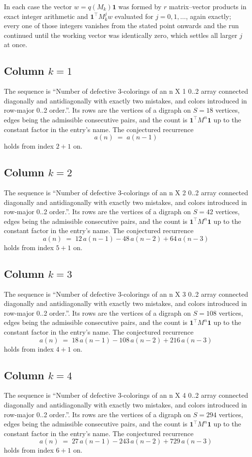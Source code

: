 \documentclass[11pt,a4paper]{article}
\theoremstyle{plain}
\theoremstyle{definition}
\begin{document}
In each case the vector $w=q(M_k)\mathbf{1}$ was formed by $r$ matrix--vector products in
exact integer arithmetic and $\mathbf{1}^{\!\top}M_k^{j}w$ evaluated for $j=0,1,\dots$,
again exactly; every one of those integers vanishes from the stated point onwards and the run
continued until the working vector was identically zero, which settles all larger $j$ at once.

\subsection*{Column $k$$=1$}
The sequence is ``Number of defective 3-colorings of an n X 1 0..2 array connected diagonally and antidiagonally with exactly two mistakes, and colors introduced in row-major 0..2 order.''. Its rows are the vertices of a digraph on
$S=18$ vertices, edges being the admissible consecutive pairs, and the count is
$\mathbf{1}^{\!\top}M^{n}\mathbf{1}$ up to the constant factor in the entry's name.
The conjectured recurrence
\[
a(n)\;=\;a(n-1)
\]
holds from index $2+1$ on.

\subsection*{Column $k$$=2$}
The sequence is ``Number of defective 3-colorings of an n X 2 0..2 array connected diagonally and antidiagonally with exactly two mistakes, and colors introduced in row-major 0..2 order.''. Its rows are the vertices of a digraph on
$S=42$ vertices, edges being the admissible consecutive pairs, and the count is
$\mathbf{1}^{\!\top}M^{n}\mathbf{1}$ up to the constant factor in the entry's name.
The conjectured recurrence
\[
a(n)\;=\;12\,a(n-1) - 48\,a(n-2) + 64\,a(n-3)
\]
holds from index $5+1$ on.

\subsection*{Column $k$$=3$}
The sequence is ``Number of defective 3-colorings of an n X 3 0..2 array connected diagonally and antidiagonally with exactly two mistakes, and colors introduced in row-major 0..2 order.''. Its rows are the vertices of a digraph on
$S=108$ vertices, edges being the admissible consecutive pairs, and the count is
$\mathbf{1}^{\!\top}M^{n}\mathbf{1}$ up to the constant factor in the entry's name.
The conjectured recurrence
\[
a(n)\;=\;18\,a(n-1) - 108\,a(n-2) + 216\,a(n-3)
\]
holds from index $4+1$ on.

\subsection*{Column $k$$=4$}
The sequence is ``Number of defective 3-colorings of an n X 4 0..2 array connected diagonally and antidiagonally with exactly two mistakes, and colors introduced in row-major 0..2 order.''. Its rows are the vertices of a digraph on
$S=294$ vertices, edges being the admissible consecutive pairs, and the count is
$\mathbf{1}^{\!\top}M^{n}\mathbf{1}$ up to the constant factor in the entry's name.
The conjectured recurrence
\[
a(n)\;=\;27\,a(n-1) - 243\,a(n-2) + 729\,a(n-3)
\]
holds from index $6+1$ on.
\end{document}
